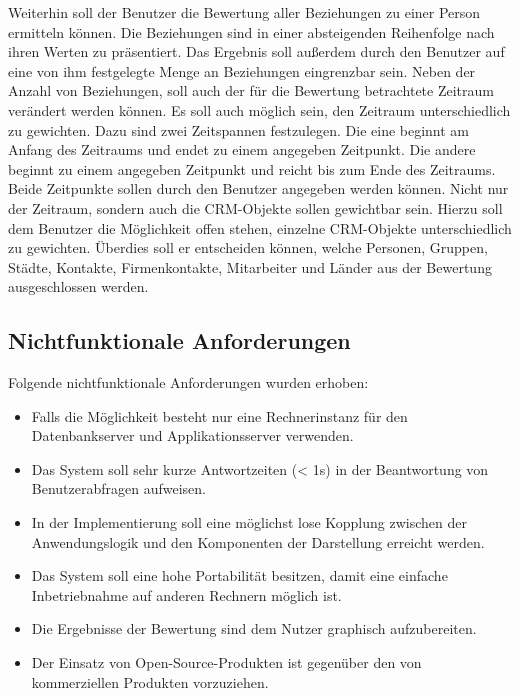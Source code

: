Weiterhin soll der Benutzer die Bewertung aller Beziehungen zu einer Person ermitteln können. Die Beziehungen sind in einer absteigenden Reihenfolge nach ihren Werten zu präsentiert. Das Ergebnis soll außerdem durch den Benutzer auf eine von ihm festgelegte Menge an Beziehungen eingrenzbar sein. Neben der Anzahl von Beziehungen, soll auch der für die Bewertung betrachtete Zeitraum verändert werden können. Es soll auch möglich sein, den Zeitraum unterschiedlich zu gewichten. Dazu sind zwei Zeitspannen festzulegen. Die eine beginnt am Anfang des Zeitraums und endet zu einem angegeben Zeitpunkt. Die andere beginnt zu einem angegeben Zeitpunkt und reicht bis zum Ende des Zeitraums. Beide Zeitpunkte sollen durch den Benutzer angegeben werden können. Nicht nur der Zeitraum, sondern auch die CRM-Objekte sollen gewichtbar sein. Hierzu soll dem Benutzer die Möglichkeit offen stehen, einzelne CRM-Objekte unterschiedlich zu gewichten. Überdies soll er entscheiden können, welche Personen, Gruppen, Städte, Kontakte, Firmenkontakte, Mitarbeiter und Länder aus der Bewertung ausgeschlossen werden.

\subsection{Nichtfunktionale Anforderungen}

Folgende nichtfunktionale Anforderungen wurden erhoben:

\begin{itemize}
	
	\item Falls die Möglichkeit besteht nur eine Rechnerinstanz für den Datenbankserver und Applikationsserver verwenden.
	
	\item Das System soll sehr kurze Antwortzeiten (< 1s) in der Beantwortung von Benutzerabfragen aufweisen. 
	
	\item In der Implementierung soll eine möglichst lose Kopplung zwischen der Anwendungslogik und den Komponenten der Darstellung erreicht werden.
	
	\item Das System soll eine hohe Portabilität besitzen, damit eine einfache Inbetriebnahme auf anderen Rechnern möglich ist.
	
	\item Die Ergebnisse der Bewertung sind dem Nutzer graphisch aufzubereiten. 
	
	\item Der Einsatz von Open-Source-Produkten ist gegenüber den von kommerziellen Produkten vorzuziehen.

\end{itemize}

